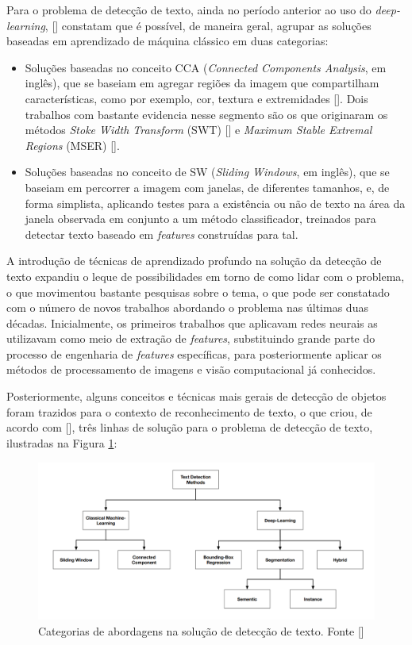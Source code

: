 Para o problema de detecção de texto, ainda no período anterior ao uso do \textit{deep-learning}, [] constatam que é possível, de maneira geral, agrupar as soluções baseadas em aprendizado de máquina clássico em duas categorias:
\begin{itemize}
    \item Soluções baseadas no conceito CCA (\textit{Connected Components Analysis}, em inglês), que se baseiam em agregar regiões da imagem que compartilham características, como por exemplo, cor, textura e extremidades []. Dois trabalhos com bastante evidencia nesse segmento são os que originaram os métodos \textit{Stoke Width Transform} (SWT) [] e \textit{Maximum Stable Extremal Regions} (MSER) [].
    \item Soluções baseadas no conceito de SW (\textit{Sliding Windows}, em inglês), que se baseiam em percorrer a imagem com janelas, de diferentes tamanhos, e, de forma simplista, aplicando testes para a existência ou não de texto na área da janela observada em conjunto a um método classificador, treinados para detectar texto baseado em \textit{features} construídas para tal.
\end{itemize}

A introdução de técnicas de aprendizado profundo na solução da detecção de texto expandiu o leque de possibilidades em torno de como lidar com o problema, o que movimentou bastante pesquisas sobre o tema, o que pode ser constatado com o número de novos trabalhos abordando o problema nas últimas duas décadas. Inicialmente, os primeiros trabalhos que aplicavam redes neurais as utilizavam como meio de extração de \textit{features}, substituindo grande parte do processo de engenharia de \textit{features} específicas, para posteriormente aplicar os métodos de processamento de imagens e visão computacional já conhecidos.

Posteriormente, alguns conceitos e técnicas mais gerais de detecção de objetos foram trazidos para o contexto de reconhecimento de texto, o que criou, de acordo com [], três linhas de solução para o problema de detecção de texto, ilustradas na Figura \ref{fig:theory-detection-categories}:

\begin{figure}
    \centering
    \includegraphics[width=\textwidth]{figs/theory-detection-categories.png}
    \caption{Categorias de abordagens na solução de detecção de texto. Fonte []}
    \label{fig:theory-detection-categories}
\end{figure}

